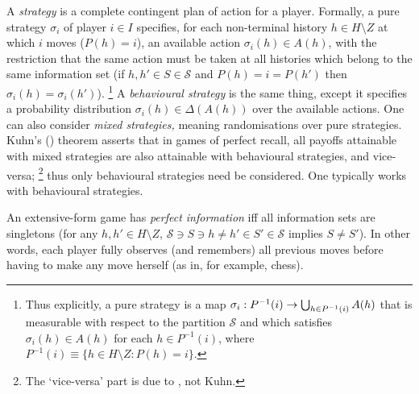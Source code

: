 \documentclass[11pt,letterpaper,reqno,oneside]{book}
\begin{document}
A \emph{strategy} is a complete contingent plan of action for a player. Formally, a pure strategy $\sigma_i$ of player $i \in I$ specifies, for each non-terminal history $h \in H \setminus Z$ at which $i$ moves ($P(h)=i$), an available action $\sigma_i(h) \in A(h)$, with the restriction that the same action must be taken at all histories which belong to the same information set (if $h,h' \in S \in \mathcal{S}$ and $P(h)=i=P(h')$ then $\sigma_i(h)=\sigma_i(h')$).%
	\footnote{Thus explicitly, a pure strategy is a map $\sigma_i : P^{-1}(i) \to \bigcup_{h \in P^{-1}(i)} A(h)$ that is measurable with respect to the partition $\mathcal{S}$ and which satisfies $\sigma_i(h) \in A(h)$ for each $h \in P^{-1}(i)$, where $P^{-1}(i) \equiv \{ h \in H \setminus Z : P(h) = i \}$.}
A \emph{behavioural strategy} is the same thing, except it specifies a probability distribution $\sigma_i(h) \in \Delta(A(h))$ over the available actions. One can also consider \emph{mixed strategies,} meaning randomisations over pure strategies. Kuhn's (\citeyear{Kuhn1950,Kuhn1953}) theorem asserts that in games of perfect recall, all payoffs attainable with mixed strategies are also attainable with behavioural strategies, and vice-versa;%
	\footnote{The `vice-versa' part is due to \textcite{Isbell1954,Isbell1957}, not Kuhn.}
thus only behavioural strategies need be considered.
One typically works with behavioural strategies.

An extensive-form game has \emph{perfect information} iff all information sets are singletons (for any $h,h' \in H \setminus Z$, $\mathcal{S} \ni S \ni h \neq h' \in S' \in \mathcal{S}$ implies $S \neq S'$). In other words, each player fully observes (and remembers) all previous moves before having to make any move herself (as in, for example, chess).
\end{document}
